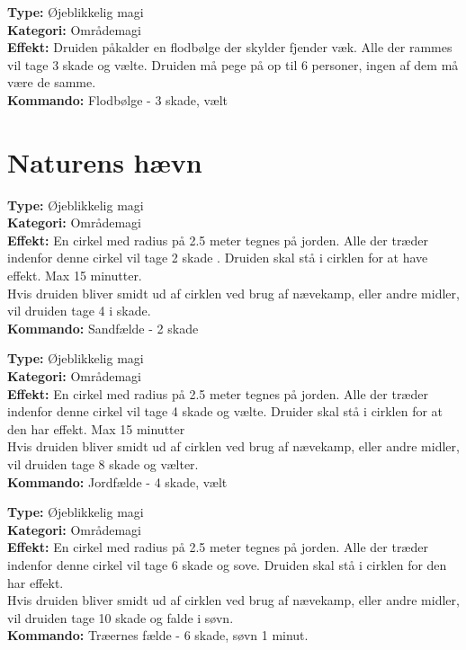 \begin{nkaos*}[Flodbølge]
\textbf{Type:} Øjeblikkelig magi\\
\textbf{Kategori:} Områdemagi\\
\textbf{Effekt:} Druiden påkalder en flodbølge der skylder fjender væk. Alle der rammes vil tage 3 skade og vælte. Druiden må pege på op til 6 personer, ingen af dem må være de samme.\\
\textbf{Kommando:} Flodbølge - 3 skade, vælt
\end{nkaos*}

\section*{Naturens hævn}

\begin{nhævn*}[Sandfælde]
\textbf{Type:} Øjeblikkelig magi\\ 
\textbf{Kategori:} Områdemagi\\
\textbf{Effekt:} En cirkel med radius på 2.5 meter tegnes på jorden. Alle der træder indenfor denne cirkel vil tage 2
skade . Druiden skal stå i cirklen for at have effekt. Max 15 minutter. \\ 
Hvis druiden bliver smidt ud af cirklen ved brug af nævekamp, eller andre midler, vil druiden tage 4 i skade.\\
\textbf{Kommando:} Sandfælde - 2 skade
\end{nhævn*}


\begin{nhævn*}[Jordfælde]
\textbf{Type:} Øjeblikkelig magi\\ 
\textbf{Kategori:} Områdemagi\\
\textbf{Effekt:} En cirkel med radius på 2.5 meter tegnes på jorden. Alle der træder indenfor denne cirkel vil tage 4 skade og vælte. Druider skal stå i cirklen for at den har effekt. Max 15 minutter\\
Hvis druiden bliver smidt ud af cirklen ved brug af nævekamp, eller andre midler, vil druiden tage 8 skade og vælter.\\
\textbf{Kommando:} Jordfælde - 4 skade, vælt
\end{nhævn*}

\begin{nhævn*}
\textbf{Type:} Øjeblikkelig magi\\
\textbf{Kategori:} Områdemagi\\
\textbf{Effekt:} En cirkel med radius på 2.5 meter tegnes på jorden. Alle der træder indenfor denne cirkel vil tage 6 skade og sove. Druiden skal stå i cirklen for den har effekt.\\
Hvis druiden bliver smidt ud af cirklen ved brug af nævekamp, eller andre midler, vil druiden tage 10 skade og falde i søvn.\\
\textbf{Kommando:} Træernes fælde - 6 skade, søvn 1 minut.
\end{nhævn*}

